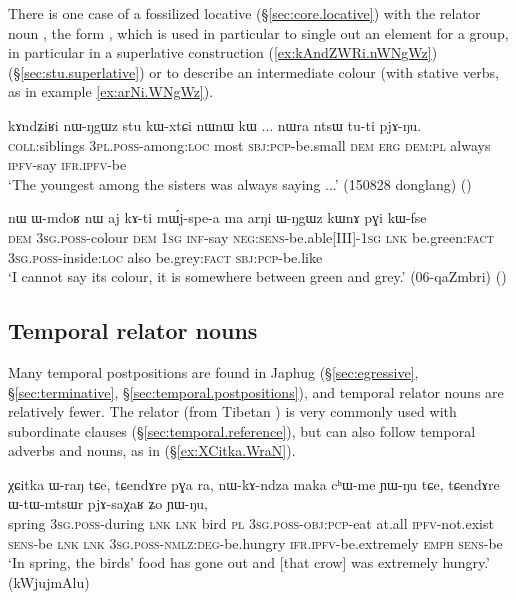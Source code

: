 There is one case of a fossilized  locative (§\ref{sec:core.locative}) with the relator noun , the form , which is used in particular to single out an element for a group, in particular in a superlative construction (\ref{ex:kAndZWRi.nWNgWz}) (§\ref{sec:stu.superlative}) or to describe an intermediate colour (with stative verbs, as in example \ref{ex:arNi.WNgWz}).

\begin{exe}
\ex \label{ex:kAndZWRi.nWNgWz} 
\gll kɤndʑiʁi nɯ-ŋgɯz stu kɯ-xtɕi nɯnɯ kɯ ... nɯra ntsɯ tu-ti pjɤ-ŋu. \\
\textsc{coll}:siblings \textsc{3pl}.\textsc{poss}-among:\textsc{loc} most \textsc{sbj}:\textsc{pcp}-be.small \textsc{dem} \textsc{erg} { } \textsc{dem}:\textsc{pl} always \textsc{ipfv}-say \textsc{ifr}.\textsc{ipfv}-be \\
\glt `The youngest among the sisters was always saying ...' (150828 donglang)
()
  \end{exe}
  
  \begin{exe}
\ex \label{ex:arNi.WNgWz} 
\gll nɯ ɯ-mdoʁ nɯ aj kɤ-ti mɯ́j-spe-a ma arŋi ɯ-ŋgɯz kɯnɤ pɣi kɯ-fse   \\
\textsc{dem} \textsc{3sg}.\textsc{poss}-colour \textsc{dem} \textsc{1sg} \textsc{inf}-say \textsc{neg}:\textsc{sens}-be.able[III]-\textsc{1sg} \textsc{lnk} be.green:\textsc{fact} \textsc{3sg}.\textsc{poss}-inside:\textsc{loc} also be.grey:\textsc{fact} \textsc{sbj}:\textsc{pcp}-be.like \\
\glt `I cannot say its colour, it is somewhere between green and grey.' (06-qaZmbri)
()
    \end{exe}
    
 
 \subsection{Temporal relator nouns} \label{sec:relator.temporal}
Many temporal postpositions are found in Japhug (§\ref{sec:egressive}, §\ref{sec:terminative}, §\ref{sec:temporal.postpositions}), and temporal relator nouns are relatively fewer. The relator   (from Tibetan ) is very commonly used with subordinate clauses (§\ref{sec:temporal.reference}), but can also follow temporal adverbs and nouns, as in (§\ref{ex:XCitka.WraN}).
 
   \begin{exe}
\ex \label{ex:XCitka.WraN} 
\gll χɕitka ɯ-raŋ tɕe, tɕendɤre pɣa ra, nɯ-kɤ-ndza maka cʰɯ-me ɲɯ-ŋu tɕe, tɕendɤre ɯ-tɯ-mtsɯr pjɤ-saχaʁ ʑo ɲɯ-ŋu,  \\
spring \textsc{3sg}.\textsc{poss}-during \textsc{lnk} \textsc{lnk} bird \textsc{pl} \textsc{3sg}.\textsc{poss}-\textsc{obj}:\textsc{pcp}-eat at.all \textsc{ipfv}-not.exist \textsc{sens}-be \textsc{lnk} \textsc{lnk} \textsc{3sg}.\textsc{poss}-\textsc{nmlz}:\textsc{deg}-be.hungry \textsc{ifr}.\textsc{ipfv}-be.extremely \textsc{emph} \textsc{sens}-be \\
\glt `In spring, the birds' food has gone out and [that crow] was extremely hungry.' (kWjujmAlu)
\end{exe}

